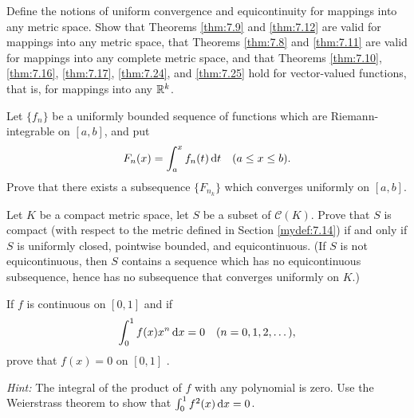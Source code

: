 \begin{myexercise}
    \label{ex:7.17}
    Define the notions of uniform convergence and equicontinuity for mappings into any metric space. 
    Show that Theorems \ref{thm:7.9} and \ref{thm:7.12} are valid for mappings into any metric space, 
    that Theorems \ref{thm:7.8} and \ref{thm:7.11} are valid for mappings into any complete metric space, 
    and that Theorems \ref{thm:7.10}, \ref{thm:7.16}, \ref{thm:7.17}, \ref{thm:7.24}, and \ref{thm:7.25} hold for vector-valued functions, that is, for mappings into any ${\protect\mathbb R}^k$.
\end{myexercise}


\begin{myexercise}
    \label{ex:7.18}
    Let $\{f_n\}$ be a uniformly bounded sequence of functions which are Riemann-integrable on $[a, b]$, and put
    \begin{equation*}
        F_n (x) = \int_{a}^{x} f_n(t) \d t \quad 
        (a \leq x \leq b).
    \end{equation*}
    Prove that there exists a subsequence $\{F_{n_k}\}$ which converges uniformly on $[a,b]$.
\end{myexercise}


\begin{myexercise}
    \label{ex:7.19}
    Let $K$ be a compact metric space, let $S$ be a subset of $\mathscr{C}(K)$. 
    Prove that $S$ is compact 
    (with respect to the metric defined in Section \ref{mydef:7.14}) 
    if and only if $S$ is uniformly closed, pointwise bounded, and equicontinuous. 
    (If $S$ is not equicontinuous, then $S$ contains a sequence which has no equicontinuous subsequence, hence has no subsequence that converges uniformly on $K$.)
\end{myexercise}


\begin{myexercise}
    \label{ex:7.20}
    If $f$ is continuous on $[0,1]$ and if 
    \begin{equation*}
        \int_{0}^{1} f(x) x^n \d x = 0 \quad 
        (n = 0,1,2,\dots),
    \end{equation*}
    prove that $f(x)=0$ on $[0,1]$ .
    
    \emph{Hint:} The integral of the product of $f$ with any polynomial is zero.
    Use the Weierstrass theorem to show that $\int_{0}^{1}f^2(x) \d x = 0$.
\end{myexercise}


